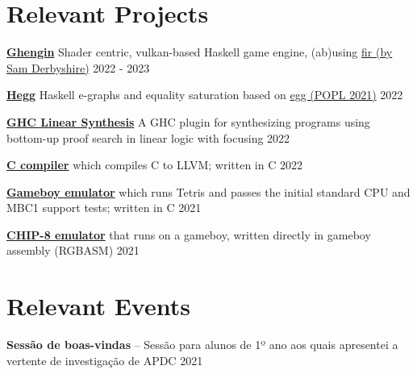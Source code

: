 \documentclass{article}
\newlength{\spacebox}
\newcommand{\skill}[2]{
\noindent\hangindent=2em\hangafter=0
\parbox{3\spacebox}{ \textsc{#1}} #2 \par}
\newcommand{\lientry}[3]{
\small
  \noindent \textbf{#1} #2 \hfill #3
\normalsize
}
\begin{document}
\section*{Relevant Projects}

  \lientry
    {\href{https://github.com/alt-romes/ghengin}{Ghengin}}
    {Shader centric, vulkan-based Haskell game engine, (ab)using
    \href{https://gitlab.com/sheaf/fir}{fir (by Sam Derbyshire)}}
    {2022 - 2023}

  \lientry
    {\href{https://github.com/alt-romes/hegg}{Hegg}}
    {Haskell e-graphs and equality saturation based on
    \href{https://dl.acm.org/doi/10.1145/3434304}{egg (POPL 2021)}}
    {2022}

  \lientry
    {\href{https://github.com/alt-romes/ghc-linear-synthesis-plugin}{GHC Linear Synthesis}}
    {A GHC plugin for synthesizing programs using bottom-up proof search in
    linear logic with focusing}
    {2022}

  \lientry
    {\href{https://github.com/alt-romes/c-compiler}{C compiler}}
    {which compiles C to LLVM; written in C}
    {2022}



  \lientry
    {\href{https://github.com/alt-romes/gameboyemulator}{Gameboy emulator}}
    {which runs Tetris and passes the initial standard CPU and MBC1
    support tests; written in C}
    {2021}

  \lientry
    {\href{https://github.com/alt-romes/chip8-emulator-for-gameboy}{CHIP-8 emulator}}
    {that runs on a gameboy, written directly in gameboy assembly (RGBASM)}
    {2021}

\section*{Relevant Events}

  \lientry
    {Sessão de boas-vindas}
    {-- Sessão para alunos de 1º ano aos quais apresentei a vertente de
    investigação de APDC}
    {2021}




\end{document}
